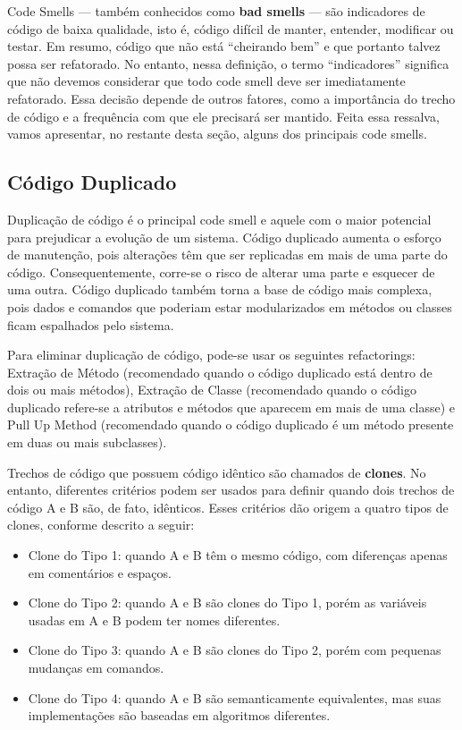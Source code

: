 \documentclass[
  11pt,
  twoside]{book}
\begin{document}
 

Code Smells --- também conhecidos como \textbf{bad smells} --- são
indicadores de código de baixa qualidade, isto é, código difícil de
manter, entender, modificar ou testar. Em resumo, código que não está
``cheirando bem'' e que portanto talvez possa ser refatorado. No
entanto, nessa definição, o termo ``indicadores'' significa que não
devemos considerar que todo code smell deve ser imediatamente
refatorado. Essa decisão depende de outros fatores, como a importância
do trecho de código e a frequência com que ele precisará ser mantido.
Feita essa ressalva, vamos apresentar, no restante desta seção, alguns
dos principais code smells.

\hypertarget{cuxf3digo-duplicado}{%
\subsection{Código Duplicado}\label{cuxf3digo-duplicado}}

 

Duplicação de código é o principal code smell e aquele com o maior
potencial para prejudicar a evolução de um sistema. Código duplicado
aumenta o esforço de manutenção, pois alterações têm que ser replicadas
em mais de uma parte do código. Consequentemente, corre-se o risco de
alterar uma parte e esquecer de uma outra. Código duplicado também torna
a base de código mais complexa, pois dados e comandos que poderiam estar
modularizados em métodos ou classes ficam espalhados pelo sistema.

Para eliminar duplicação de código, pode-se usar os seguintes
refactorings: Extração de Método (recomendado quando o código duplicado
está dentro de dois ou mais métodos), Extração de Classe (recomendado
quando o código duplicado refere-se a atributos e métodos que aparecem
em mais de uma classe) e Pull Up Method (recomendado quando o código
duplicado é um método presente em duas ou mais subclasses).

 
 Trechos de código que possuem
código idêntico são chamados de \textbf{clones}. No entanto, diferentes
critérios podem ser usados para definir quando dois trechos de código A
e B são, de fato, idênticos. Esses critérios dão origem a quatro tipos
de clones, conforme descrito a seguir:

\begin{itemize}
\item
  Clone do Tipo 1: quando A e B têm o mesmo código, com diferenças
  apenas em comentários e espaços.
\item
  Clone do Tipo 2: quando A e B são clones do Tipo 1, porém as variáveis
  usadas em A e B podem ter nomes diferentes.
\item
  Clone do Tipo 3: quando A e B são clones do Tipo 2, porém com pequenas
  mudanças em comandos.
\item
  Clone do Tipo 4: quando A e B são semanticamente equivalentes, mas
  suas implementações são baseadas em algoritmos diferentes.
\end{itemize}
\end{document}
